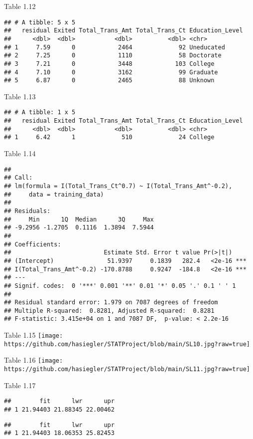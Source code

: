 \documentclass[
]{article}
\begin{document}
Table 1.12

\begin{verbatim}
## # A tibble: 5 x 5
##   residual Exited Total_Trans_Amt Total_Trans_Ct Education_Level
##      <dbl>  <dbl>           <dbl>          <dbl> <chr>          
## 1     7.59      0            2464             92 Uneducated     
## 2     7.25      0            1110             58 Doctorate      
## 3     7.21      0            3448            103 College        
## 4     7.10      0            3162             99 Graduate       
## 5     6.87      0            2465             88 Unknown
\end{verbatim}

Table 1.13

\begin{verbatim}
## # A tibble: 1 x 5
##   residual Exited Total_Trans_Amt Total_Trans_Ct Education_Level
##      <dbl>  <dbl>           <dbl>          <dbl> <chr>          
## 1     6.42      1             510             24 College
\end{verbatim}

Table 1.14

\begin{verbatim}
## 
## Call:
## lm(formula = I(Total_Trans_Ct^0.7) ~ I(Total_Trans_Amt^-0.2), 
##     data = training_data)
## 
## Residuals:
##     Min      1Q  Median      3Q     Max 
## -9.2956 -1.2705  0.1116  1.3894  7.5944 
## 
## Coefficients:
##                          Estimate Std. Error t value Pr(>|t|)    
## (Intercept)               51.9397     0.1839   282.4   <2e-16 ***
## I(Total_Trans_Amt^-0.2) -170.8788     0.9247  -184.8   <2e-16 ***
## ---
## Signif. codes:  0 '***' 0.001 '**' 0.01 '*' 0.05 '.' 0.1 ' ' 1
## 
## Residual standard error: 1.979 on 7087 degrees of freedom
## Multiple R-squared:  0.8281, Adjusted R-squared:  0.8281 
## F-statistic: 3.415e+04 on 1 and 7087 DF,  p-value: < 2.2e-16
\end{verbatim}

Table 1.15
\texttt{[image: https://github.com/hasiegler/STATProject/blob/main/SL10.jpg?raw=true]}

Table 1.16
\texttt{[image: https://github.com/hasiegler/STATProject/blob/main/SL11.jpg?raw=true]}

Table 1.17

\begin{verbatim}
##        fit      lwr      upr
## 1 21.94403 21.88345 22.00462
\end{verbatim}

\begin{verbatim}
##        fit      lwr      upr
## 1 21.94403 18.06353 25.82453
\end{verbatim}
\end{document}
